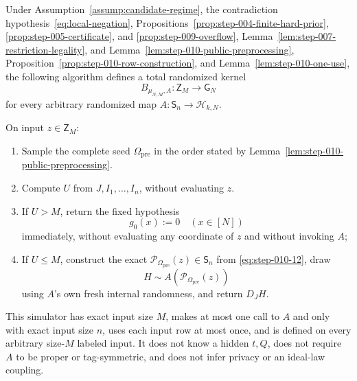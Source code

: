 \begin{proposition}\label{prop:step-010-simulator}
Under Assumption~\ref{assump:candidate-regime}, the contradiction hypothesis~\eqref{eq:local-negation},
Propositions~\ref{prop:step-004-finite-hard-prior},
\ref{prop:step-005-certificate}, and
\ref{prop:step-009-overflow}, Lemma~\ref{lem:step-007-restriction-legality}, and
Lemma~\ref{lem:step-010-public-preprocessing},
Proposition~\ref{prop:step-010-row-construction}, and
Lemma~\ref{lem:step-010-one-use}, the following algorithm defines a
total randomized kernel
\[
  B_{\mu_{N,M},A}:\mathsf Z_M\longrightarrow\mathsf G_N
\]
for every arbitrary randomized map
\(A:\mathsf S_n\to\mathcal H_{k,N}\).

On input \(z\in\mathsf Z_M\):

\begin{enumerate}
\item Sample the complete seed \(\Omega_{\mathrm{pre}}\) in the order stated
by Lemma~\ref{lem:step-010-public-preprocessing}.
\item Compute \(U\) from \(J,I_1,\ldots,I_n\), without evaluating \(z\).
\item If \(U>M\), return the fixed hypothesis
   \[
     g_0(x):=0\quad(x\in[N])
   \tag{S10.16}\label{eq:step-010-16}
   \]
   immediately, without evaluating any coordinate of \(z\) and without
   invoking \(A\);
\item If \(U\le M\), construct the exact
   \(\mathcal P_{\Omega_{\mathrm{pre}}}(z)\in\mathsf S_n\) from \eqref{eq:step-010-12}, draw
   \[
     H\sim A(\mathcal P_{\Omega_{\mathrm{pre}}}(z))
   \]
   using \(A\)'s own fresh internal randomness, and return \(D_JH\).
\end{enumerate}

This simulator has exact input size \(M\), makes at most one call to \(A\)
and only with exact input size \(n\), uses each input row at most once, and
is defined on every arbitrary size-\(M\) labeled input. It does not know a
hidden \(t,Q\), does not require \(A\) to be proper or tag-symmetric, and
does not infer privacy or an ideal-law coupling.
\end{proposition}

